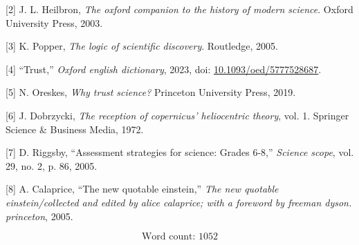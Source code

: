 \documentclass[11pt]{article}
\begin{document}
\hypertarget{citeproc_bib_item_2}{[2] J. L. Heilbron, \textit{The oxford companion to the history of modern science}. Oxford University Press, 2003.}

\hypertarget{citeproc_bib_item_3}{[3] K. Popper, \textit{The logic of scientific discovery}. Routledge, 2005.}

\hypertarget{citeproc_bib_item_4}{[4] “Trust,” \textit{Oxford english dictionary}, 2023, doi: \href{https://doi.org/10.1093/oed/5777528687}{10.1093/oed/5777528687}.}

\hypertarget{citeproc_bib_item_5}{[5] N. Oreskes, \textit{Why trust science?} Princeton University Press, 2019.}

\hypertarget{citeproc_bib_item_6}{[6] J. Dobrzycki, \textit{The reception of copernicus’ heliocentric theory}, vol. 1. Springer Science \& Business Media, 1972.}

\hypertarget{citeproc_bib_item_7}{[7] D. Riggsby, “Assessment strategies for science: Grades 6-8,” \textit{Science scope}, vol. 29, no. 2, p. 86, 2005.}

\hypertarget{citeproc_bib_item_8}{[8] A. Calaprice, “The new quotable einstein,” \textit{The new quotable einstein/collected and edited by alice calaprice; with a foreword by freeman dyson. princeton}, 2005.}\bigskip

\[\text{Word count: } 1052\]
\end{document}
